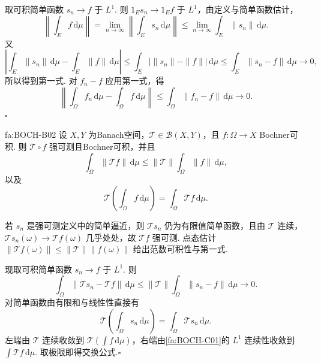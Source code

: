 \begin{FAProof}
取可积简单函数 \(\displaystyle s_n\to f\) 于 \(\displaystyle L^1\). 则 \(\displaystyle1_Es_n\to1_Ef\) 于 \(\displaystyle L^1\)，由定义与简单函数估计，
\[
\left\|\int_Ef\,\mathrm{d}\mu\right\|
=
\lim_{n\to\infty}
\left\|\int_Es_n\,\mathrm{d}\mu\right\|
\leqslant
\lim_{n\to\infty}
\int_E\|s_n\|\,\mathrm{d}\mu.
\]
又
\[
\left|\int_E\|s_n\|\,\mathrm{d}\mu-
\int_E\|f\|\,\mathrm{d}\mu\right|
\leqslant
\int_E\bigl|\|s_n\|-\|f\|\bigr|\,\mathrm{d}\mu
\leqslant
\int_E\|s_n-f\|\,\mathrm{d}\mu
\longrightarrow0,
\]
所以得到第一式. 对 \(\displaystyle f_n-f\) 应用第一式，得
\[
\left\|\int_\Omega f_n\,\mathrm{d}\mu-
\int_\Omega f\,\mathrm{d}\mu\right\|
\leqslant
\int_\Omega\|f_n-f\|\,\mathrm{d}\mu
\longrightarrow0.\]\hfill\(\square\)


\end{FAProof}

\begin{FATheorem}[B][有界算子与Bochner积分交换]{fa:BOCH-B02}
设 \(\displaystyle X,Y\) 为Banach空间，\(\displaystyle\mathcal T\in\mathcal B(X,Y)\)，且 \(\displaystyle f:\Omega\to X\) Bochner可积. 则 \(\displaystyle\mathcal T\circ f\) 强可测且Bochner可积，并且
\[
\int_\Omega\|\mathcal T f\|\,\mathrm{d}\mu
\leqslant
\|\mathcal T\|
\int_\Omega\|f\|\,\mathrm{d}\mu,
\]
以及
\[
\mathcal T\left(\int_\Omega f\,\mathrm{d}\mu\right)
=
\int_\Omega\mathcal T f\,\mathrm{d}\mu.
\]
\end{FATheorem}

\begin{FAProof}
若 \(\displaystyle s_n\) 是强可测定义中的简单逼近，则 \(\displaystyle\mathcal Ts_n\) 仍为有限值简单函数，且由 \(\displaystyle\mathcal T\) 连续，\(\displaystyle\mathcal Ts_n(\omega)\to\mathcal Tf(\omega)\) 几乎处处，故 \(\displaystyle\mathcal Tf\) 强可测. 点态估计
\(\displaystyle \|\mathcal Tf(\omega)\|\leqslant\|\mathcal T\|\|f(\omega)\|\)
给出范数可积性与第一式.

现取可积简单函数 \(\displaystyle s_n\to f\) 于 \(\displaystyle L^1\). 则
\[
\int_\Omega\|\mathcal Ts_n-\mathcal Tf\|\,\mathrm{d}\mu
\leqslant
\|\mathcal T\|
\int_\Omega\|s_n-f\|\,\mathrm{d}\mu
\longrightarrow0.
\]
对简单函数由有限和与线性性直接有
\[
\mathcal T\left(\int_\Omega s_n\,\mathrm{d}\mu\right)
=
\int_\Omega\mathcal Ts_n\,\mathrm{d}\mu.
\]
左端由 \(\displaystyle\mathcal T\) 连续收敛到 \(\displaystyle\mathcal T(\int f\,\mathrm{d}\mu)\)，右端由\autoref{fa:BOCH-C01}的 \(\displaystyle L^1\) 连续性收敛到 \(\displaystyle\int\mathcal Tf\,\mathrm{d}\mu\). 取极限即得交换公式.\hfill\(\square\)
\end{FAProof}

